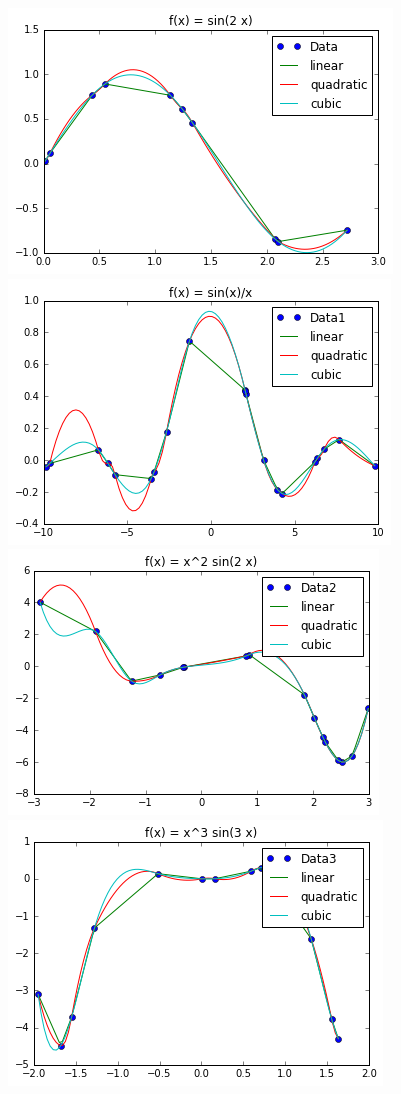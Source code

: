 \documentclass[11pt,spanish]{article}
\begin{document}
\centering 

\includegraphics{1}\\
\includegraphics{2}\\
\includegraphics{3}\\
\includegraphics{4}\\
\end{document}
